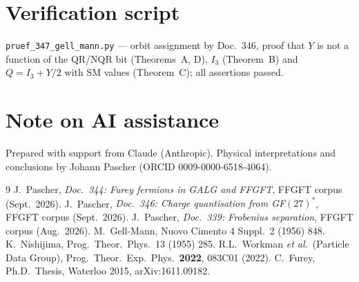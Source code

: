 \section*{Verification script}
\texttt{pruef\_347\_gell\_mann.py} --- orbit assignment by Doc.~346, proof that $Y$ is not a function of the QR/NQR bit (Theorems~A, D), $I_3$ (Theorem~B) and $Q=I_3+Y/2$ with SM values (Theorem~C); all assertions passed.

\section*{Note on AI assistance}
Prepared with support from Claude (Anthropic).
Physical interpretations and conclusions by Johann Pascher (ORCID 0009-0000-6518-4064).

\begin{thebibliography}{9}
 J.~Pascher, \textit{Doc.~344: Furey fermions in GALG and FFGFT}, FFGFT corpus (Sept.\ 2026).
 J.~Pascher, \textit{Doc.~346: Charge quantisation from GF$(27)^*$}, FFGFT corpus (Sept.\ 2026).
 J.~Pascher, \textit{Doc.~339: Frobenius separation}, FFGFT corpus (Aug.\ 2026).
 M.~Gell-Mann, Nuovo Cimento 4 Suppl.~2 (1956) 848.
 K.~Nishijima, Prog.\ Theor.\ Phys.\ 13 (1955) 285.
 R.L.~Workman \emph{et al.}\ (Particle Data Group),
Prog.\ Theor.\ Exp.\ Phys.\ \textbf{2022}, 083C01 (2022).
 C.~Furey, Ph.D.\ Thesis, Waterloo 2015, arXiv:1611.09182.
\end{thebibliography}
